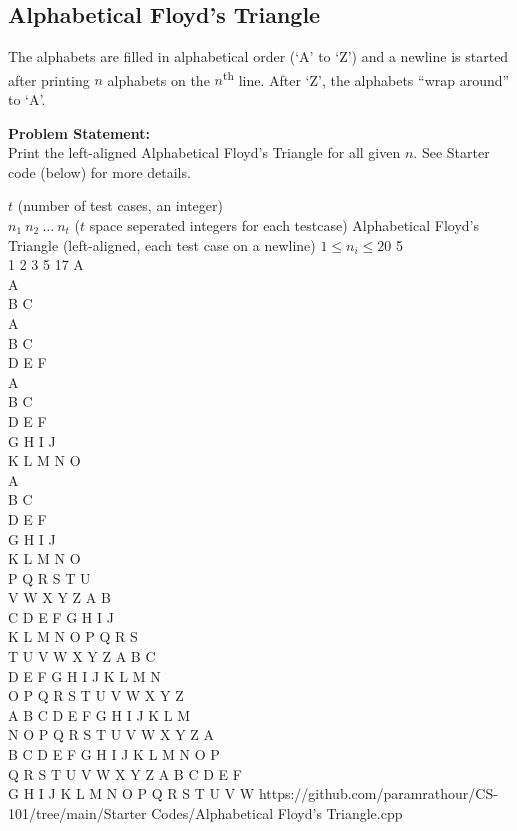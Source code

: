 \subsection{Alphabetical Floyd's Triangle}{\label{pp:alphabeticalfloydstriangle}}
The alphabets are filled in alphabetical order (`A' to `Z') and a newline is started after printing $n$ alphabets on the $n$\textsuperscript{th} line. After `Z', the alphabets ``wrap around'' to `A'.

\textbf{Problem Statement:}\\
Print the left-aligned Alphabetical Floyd's Triangle for all given $n$. See Starter code (below) for more details.
\begin{testcases}
	{$t$ \hfill(number of test cases, an integer)\\$n_1\ n_2\ \ldots\ n_t$ \hfill($t$ space seperated integers for each testcase)}
	{Alphabetical Floyd's Triangle \hfill(left-aligned, each test case on a newline)}
	{$1 \leq n_i \leq 20$}
	{5\\1 2 3 5 17}
	{A\\[1em]A\\B C\\[1em]A\\B C\\D E F\\[1em]A\\B C\\D E F\\G H I J\\K L M N O\\[1em]A\\B C\\D E F\\G H I J\\K L M N O\\P Q R S T U\\V W X Y Z A B\\C D E F G H I J\\K L M N O P Q R S\\T U V W X Y Z A B C\\D E F G H I J K L M N\\O P Q R S T U V W X Y Z\\A B C D E F G H I J K L M\\N O P Q R S T U V W X Y Z A\\B C D E F G H I J K L M N O P\\Q R S T U V W X Y Z A B C D E F\\G H I J K L M N O P Q R S T U V W}
	{https://github.com/paramrathour/CS-101/tree/main/Starter Codes/Alphabetical Floyd's Triangle.cpp}
\end{testcases}